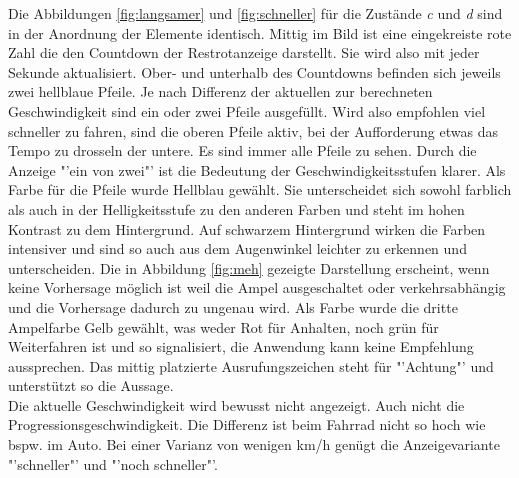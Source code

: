 Die Abbildungen \ref{fig:langsamer} und \ref{fig:schneller} für die Zustände \textit{c} und \textit{d} sind in der Anordnung der Elemente identisch. Mittig im Bild ist eine eingekreiste rote Zahl die den Countdown der Restrotanzeige darstellt. Sie wird also mit jeder Sekunde aktualisiert. Ober- und unterhalb des Countdowns befinden sich jeweils zwei hellblaue Pfeile. Je nach Differenz der aktuellen zur berechneten Geschwindigkeit sind ein oder zwei Pfeile ausgefüllt. Wird also empfohlen viel schneller zu fahren, sind die oberen Pfeile aktiv, bei der Aufforderung etwas das Tempo zu drosseln der untere. Es sind immer alle Pfeile zu sehen. Durch die Anzeige "'ein von zwei"' ist die Bedeutung der Geschwindigkeitsstufen klarer. Als Farbe für die Pfeile wurde Hellblau gewählt. Sie unterscheidet sich sowohl farblich als auch in der Helligkeitsstufe zu den anderen Farben und steht im hohen Kontrast zu dem Hintergrund. Auf schwarzem Hintergrund wirken die Farben intensiver und sind so auch aus dem Augenwinkel leichter zu erkennen und unterscheiden. Die in Abbildung \ref{fig:meh} gezeigte Darstellung erscheint, wenn keine Vorhersage möglich ist weil die Ampel ausgeschaltet oder verkehrsabhängig und die Vorhersage dadurch zu ungenau wird. Als Farbe wurde die dritte Ampelfarbe Gelb gewählt, was weder Rot für Anhalten, noch grün für Weiterfahren ist und so signalisiert, die Anwendung kann keine Empfehlung aussprechen. Das mittig platzierte Ausrufungszeichen steht für "'Achtung"' und unterstützt so die Aussage.\\
Die aktuelle Geschwindigkeit wird bewusst nicht angezeigt. Auch nicht die Progressionsgeschwindigkeit. Die Differenz ist beim Fahrrad nicht so hoch wie bspw. im Auto. Bei einer Varianz von wenigen km/h genügt die Anzeigevariante "'schneller"' und "'noch schneller"'.
